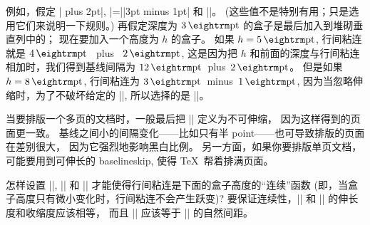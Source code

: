 \danger 例如，假定 |\baselineskip=12pt plus 2pt|,
|\lineskip=||3pt minus 1pt| 和 |\lineskiplimit=2pt|。
(这些值不是特别有用；只是选用它们来说明一下规则。)
再假定深度为 $3\pt$ 的盒子是最后加入到堆砌垂直列中的；
现在要加入一个高度为 $h$ 的盒子。%
如果 $h=5\pt$, 行间粘连就是 $4\pt$~ plus ~$2\pt$,
这是因为把 $h$ 和前面的深度与行间粘连相加时，我们得到基线间隔为 $12\pt$~plus~$2\pt$。%
但是如果 $h=8\pt$, 行间粘连为 $3\pt$~minus~$1\pt$,
因为当忽略伸缩时，为了不破坏给定的 |\lineskiplimit|, 所以选择的是 |\lineskip|。

\danger 当要排版一个多页的文档时，一般最后把 |\baselineskip| 定义为不可伸缩，
因为这样得到的页面更一致。%
基线之间小的间隔变化——比如只有半 point——也可导致排版的页面在差别很大，
因为它强烈地影响黑白比例。%
另一方面，如果你要排版单页文档，可能要用到可伸长的 baselineskip,
使得 \TeX\ 帮着排满页面。

\dangerexercise 怎样设置 |\baselineskip|, |\lineskip| 和 %
|\lineskiplimit| 才能\1使得行间粘连是下面的盒子高度的``连续''函数%
(即，当盒子高度只有微小变化时，行间粘连不会产生跃变)?
\answer 要保证连续性，|\baselineskip| 和 |\lineskip| 的伸长度和收缩度应该相等，
而且 |\lineskiplimit| 应该等于 |\lineskip| 的自然间距。

